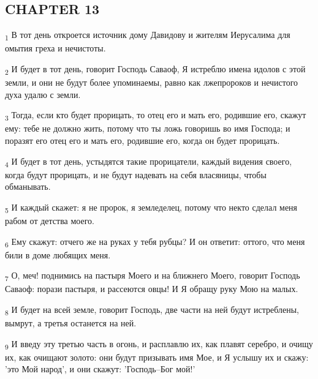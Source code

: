 \subsection{CHAPTER 13}
\begin{tcolorbox}
\textsubscript{1} В тот день откроется источник дому Давидову и жителям Иерусалима для омытия греха и нечистоты.
\end{tcolorbox}
\begin{tcolorbox}
\textsubscript{2} И будет в тот день, говорит Господь Саваоф, Я истреблю имена идолов с этой земли, и они не будут более упоминаемы, равно как лжепророков и нечистого духа удалю с земли.
\end{tcolorbox}
\begin{tcolorbox}
\textsubscript{3} Тогда, если кто будет прорицать, то отец его и мать его, родившие его, скажут ему: тебе не должно жить, потому что ты ложь говоришь во имя Господа; и поразят его отец его и мать его, родившие его, когда он будет прорицать.
\end{tcolorbox}
\begin{tcolorbox}
\textsubscript{4} И будет в тот день, устыдятся такие прорицатели, каждый видения своего, когда будут прорицать, и не будут надевать на себя власяницы, чтобы обманывать.
\end{tcolorbox}
\begin{tcolorbox}
\textsubscript{5} И каждый скажет: я не пророк, я земледелец, потому что некто сделал меня рабом от детства моего.
\end{tcolorbox}
\begin{tcolorbox}
\textsubscript{6} Ему скажут: отчего же на руках у тебя рубцы? И он ответит: оттого, что меня били в доме любящих меня.
\end{tcolorbox}
\begin{tcolorbox}
\textsubscript{7} О, меч! поднимись на пастыря Моего и на ближнего Моего, говорит Господь Саваоф: порази пастыря, и рассеются овцы! И Я обращу руку Мою на малых.
\end{tcolorbox}
\begin{tcolorbox}
\textsubscript{8} И будет на всей земле, говорит Господь, две части на ней будут истреблены, вымрут, а третья останется на ней.
\end{tcolorbox}
\begin{tcolorbox}
\textsubscript{9} И введу эту третью часть в огонь, и расплавлю их, как плавят серебро, и очищу их, как очищают золото: они будут призывать имя Мое, и Я услышу их и скажу: 'это Мой народ', и они скажут: 'Господь--Бог мой!'
\end{tcolorbox}
